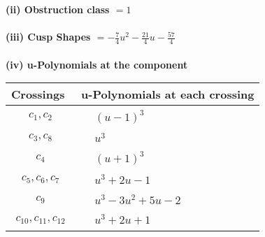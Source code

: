 \documentclass[1p]{elsarticle_modified}
\theoremstyle{definition}
\begin{document}
\flushleft \textbf{(ii) Obstruction class $= 1$}\\~\\
\flushleft \textbf{(iii) Cusp Shapes $= -\frac{7}{4} u^2-\frac{21}{4} u-\frac{57}{4}$}\\~\\
\newpage\renewcommand{\arraystretch}{1}
\flushleft \textbf{(iv) u-Polynomials at the component}\newline \\
\begin{tabular}{m{50pt}|m{274pt}}
Crossings & \hspace{64pt}u-Polynomials at each crossing \\
\hline $$\begin{aligned}c_{1},c_{2}\end{aligned}$$&$\begin{aligned}
&(u-1)^3
\end{aligned}$\\
\hline $$\begin{aligned}c_{3},c_{8}\end{aligned}$$&$\begin{aligned}
&u^3
\end{aligned}$\\
\hline $$\begin{aligned}c_{4}\end{aligned}$$&$\begin{aligned}
&(u+1)^3
\end{aligned}$\\
\hline $$\begin{aligned}c_{5},c_{6},c_{7}\end{aligned}$$&$\begin{aligned}
&u^3+2 u-1
\end{aligned}$\\
\hline $$\begin{aligned}c_{9}\end{aligned}$$&$\begin{aligned}
&u^3-3 u^2+5 u-2
\end{aligned}$\\
\hline $$\begin{aligned}c_{10},c_{11},c_{12}\end{aligned}$$&$\begin{aligned}
&u^3+2 u+1
\end{aligned}$\\
\hline
\end{tabular}\\~\\
\end{document}
